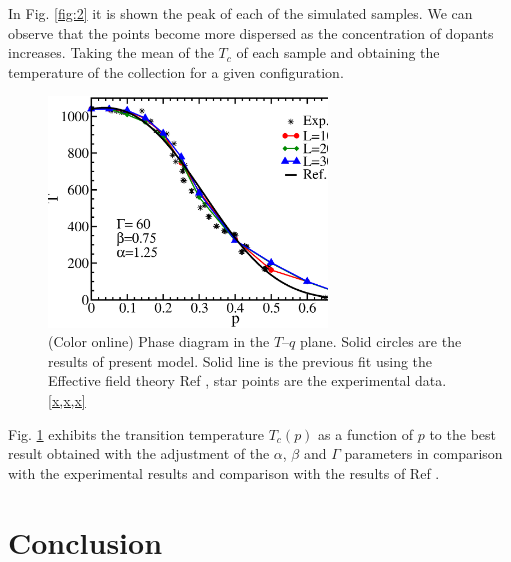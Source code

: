 \documentclass[twocolumn,5p,12pt]{elsarticle}
\begin{document}
In Fig. \ref{fig:2} it is shown the peak of each of the simulated samples. We can observe that the points become more dispersed as the concentration of dopants increases. Taking the mean of the $T_c$ of each sample and obtaining the temperature of the collection for a given configuration.



\begin{figure}[htb]
\includegraphics[width = 7.4cm]{fig3.eps}
\caption{(Color online) Phase diagram in the $T–q$ plane. Solid circles are the results of present model. Solid line is the previous fit using the Effective field theory  Ref \cite{Freitas2013}, star points are the experimental data. \ref{x,x,x} }
\label{fig:3}
\end{figure}

Fig. \ref{fig:3} exhibits the transition temperature $T_c(p)$ as a function of $p$ to the best result obtained with the adjustment of the $\alpha$, $\beta$ and $\Gamma$ parameters in comparison with the experimental results and  comparison with the results of Ref \cite{Freitas2013}.


\section{Conclusion}
\end{document}
